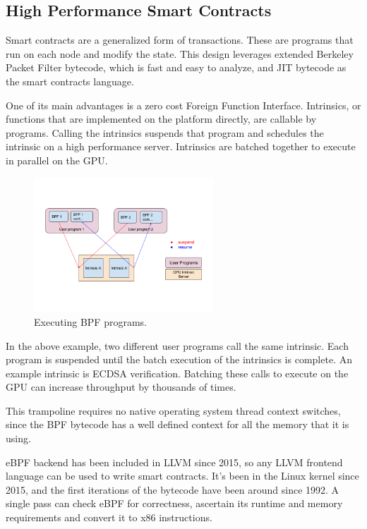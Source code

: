 \documentclass[12pt]{article}
\begin{document}
\subsection{High Performance Smart Contracts}\label{sec:smartcontracts}

Smart contracts are a generalized form of transactions. These are programs that run on each node and modify the state. This design leverages extended Berkeley Packet Filter bytecode, which is fast and easy to analyze, and JIT bytecode as the smart contracts language.

One of its main advantages is a zero cost Foreign Function Interface. Intrinsics, or  functions that are implemented on the platform directly, are callable by  programs. Calling the intrinsics suspends that program and schedules the intrinsic on a high performance server. Intrinsics are batched together to execute in parallel on the GPU.

\begin{figure}
  \begin{center}
    \centering
    \includegraphics[width=0.6\textwidth]{figures/fig_11.png}
    \caption[Fig 11]{Executing  BPF programs.\label{fig_11}}
  \end{center}
  \end{figure}

In the above example, two different user programs call the same intrinsic. Each program is suspended until the batch execution of the intrinsics is complete. An example intrinsic is ECDSA verification. Batching these calls to execute on the GPU can increase throughput by thousands of times.

This trampoline requires no native operating system thread context switches, since the BPF bytecode has a well defined context for all the memory that it is using.

eBPF backend has been included in LLVM since 2015, so any LLVM frontend language can be used to write smart contracts. It’s been in the Linux kernel since 2015, and the first iterations of the bytecode have been around since 1992. A single pass can check eBPF for correctness, ascertain its runtime and memory requirements and convert it to x86 instructions.
\end{document}
